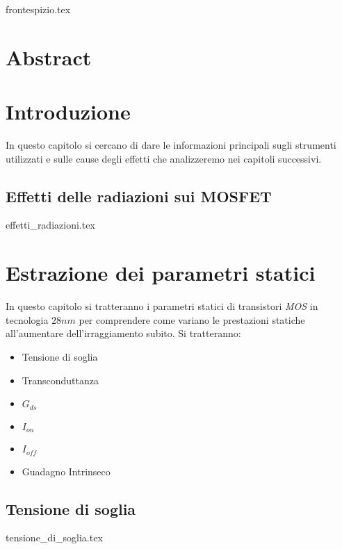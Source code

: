 \documentclass[
	a4paper,
	cleardoublepage=empty,
	headings=twolinechapter,
	numbers=autoenddot,
]{scrbook}
\begin{document}
\frontmatter

{frontespizio.tex}

\tableofcontents

\chapter*{Abstract}



\mainmatter

\chapter{Introduzione}
In questo capitolo si cercano di dare le informazioni principali sugli strumenti utilizzati e sulle cause degli effetti che analizzeremo nei capitoli successivi.
\section{Effetti delle radiazioni sui MOSFET}
{effetti_radiazioni.tex}


\chapter{Estrazione dei parametri statici}
In questo capitolo si tratteranno i parametri statici di transistori \emph{MOS} in tecnologia $28 nm$ per comprendere come variano le prestazioni statiche all'aumentare dell'irraggiamento subito. Si tratteranno:
\begin{itemize}
  \item Tensione di soglia
  \item Transconduttanza
  \item $G_{ds}$
  \item $I_{on}$
  \item $I_{off}$
  \item Guadagno Intrinseco
\end{itemize}
\section{Tensione di soglia}
{tensione_di_soglia.tex}
\end{document}

